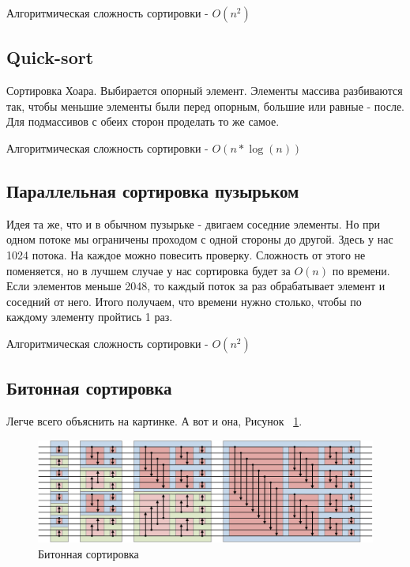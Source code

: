 \documentclass[a4paper,article]{article}
\begin{document}
    Алгоритмическая сложность сортировки - $O(n^{2})$

    \subsection{Quick-sort}

    Сортировка Хоара. Выбирается опорный элемент. Элементы массива разбиваются так, чтобы меньшие элементы были перед опорным, большие или равные - после. Для подмассивов с обеих сторон проделать то же самое.

    Алгоритмическая сложность сортировки - $O(n*\log(n))$

    \subsection{Параллельная сортировка пузырьком}

    Идея та же, что и в обычном пузырьке - двигаем соседние элементы. Но при одном потоке мы ограничены проходом с одной стороны до другой. Здесь у нас 1024 потока. На каждое можно повесить проверку. Сложность от этого не поменяется, но в лучшем случае у нас сортировка будет за $O(n)$ по времени. Если элементов меньше 2048, то каждый поток за раз обрабатывает элемент и соседний от него. Итого получаем, что времени нужно столько, чтобы по каждому элементу пройтись 1 раз.

    Алгоритмическая сложность сортировки - $O(n^{2})$

    \subsection{Битонная сортировка}

    Легче всего объяснить на картинке. А вот и она, Рисунок ~\ref{fig:bitonic-sort}.

    \begin{figure}[h]

        \centering

        \includegraphics[width=0.8\linewidth]{bitonic-sort.png}

        \caption{\centering Битонная сортировка}

        \label{fig:bitonic-sort}

    \end{figure}
\end{document}
